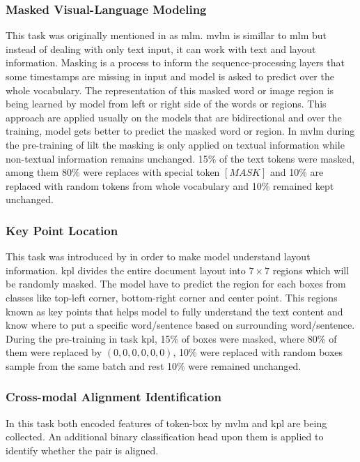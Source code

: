 \subsubsection{Masked Visual-Language Modeling}

This task was originally mentioned in \cite{devlin2018bert} as \acrfull{mlm}. \acrshort{mvlm} is simillar to \acrshort{mlm} but instead of dealing with only text input, it can work with text and layout information.  Masking is a process to inform the sequence-processing layers that some timestamps are missing in input and model is asked to predict over the whole vocabulary. The representation of this masked word or image region is being learned by model from left or right side of the words or regions. This approach are applied usually on the models that are bidirectional and over the training, model gets better to predict the masked word or region. In \acrshort{mvlm} during the pre-training of \acrshort{lilt} the masking is only applied on textual information while non-textual information remains unchanged. 15\% of the text tokens were masked, among them 80\% were replaces with special token $[MASK]$ and 10\% are replaced with random tokens from whole vocabulary and 10\% remained kept unchanged. 

\subsubsection{Key Point Location}
This task was introduced by \cite{wang-etal-2022-lilt} in order to make model understand layout information. \acrshort{kpl} divides the entire document layout into \(7\times7\) regions which will be randomly masked. The model have to predict the region for each boxes from classes like top-left corner, bottom-right corner and center point. This regions known as key points that helps model to fully understand the text content and know where to put a specific word/sentence based on surrounding word/sentence. During the pre-training in task \acrshort{kpl}, 15\% of boxes were masked, where 80\% of them were replaced by \((0,0,0,0,0,0)\), 10\% were replaced with random boxes sample from the same batch and rest 10\% were remained unchanged.

\subsubsection{Cross-modal Alignment Identification}
In this task both encoded features of token-box by \acrshort{mvlm} and \acrshort{kpl} are being collected. An additional binary classification head upon them is applied to identify whether the pair is aligned. 












